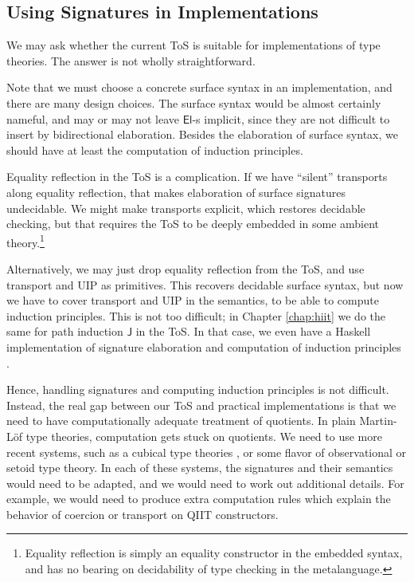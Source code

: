 \documentclass[12pt,a4paper,twoside,openany]{book}
\theoremstyle{remark}
\theoremstyle{definition}
\theoremstyle{theorem}
\newcommand{\ms}[1]{\mathsf{#1}}
\newcommand{\J}{\ms{J}}
\newcommand{\El}{\mathsf{El}}
\begin{document}
\subsection{Using Signatures in Implementations}
\label{sec:implementation}

We may ask whether the current ToS is suitable for implementations of type
theories. The answer is not wholly straightforward.

Note that we must choose a concrete surface syntax in an implementation, and
there are many design choices. The surface syntax would be almost certainly
nameful, and may or may not leave $\El$-s implicit, since they are not difficult
to insert by bidirectional elaboration. Besides the elaboration of surface
syntax, we should have at least the computation of induction principles.

Equality reflection in the ToS is a complication. If we have ``silent''
transports along equality reflection, that makes elaboration of surface
signatures undecidable. We might make transports explicit, which restores
decidable checking, but that requires the ToS to be deeply embedded in some
ambient theory.\footnote{Equality reflection is simply an equality constructor in
the embedded syntax, and has no bearing on decidability of type checking in the
metalanguage.}

Alternatively, we may just drop equality reflection from the ToS, and use
transport and UIP as primitives. This recovers decidable surface syntax, but now
we have to cover transport and UIP in the semantics, to be able to compute
induction principles. This is not too difficult; in Chapter \ref{chap:hiit} we
do the same for path induction $\J$ in the ToS. In that case, we even have a
Haskell implementation of signature elaboration and computation of induction
principles \cite{hiit-sig-program}.

Hence, handling signatures and computing induction principles is not difficult.
Instead, the real gap between our ToS and practical implementations is that we
need to have computationally adequate treatment of quotients. In plain
Martin-Löf type theories, computation gets stuck on quotients. We need to use
more recent systems, such as a cubical type theories \cite{cubicalagda,xtt}, or
some flavor of observational \cite{altenkirch2007observational} or setoid
\cite{setoidtt} type theory. In each of these systems, the signatures and their
semantics would need to be adapted, and we would need to work out additional
details. For example, we would need to produce extra computation rules which
explain the behavior of coercion or transport on QIIT constructors.
\end{document}
